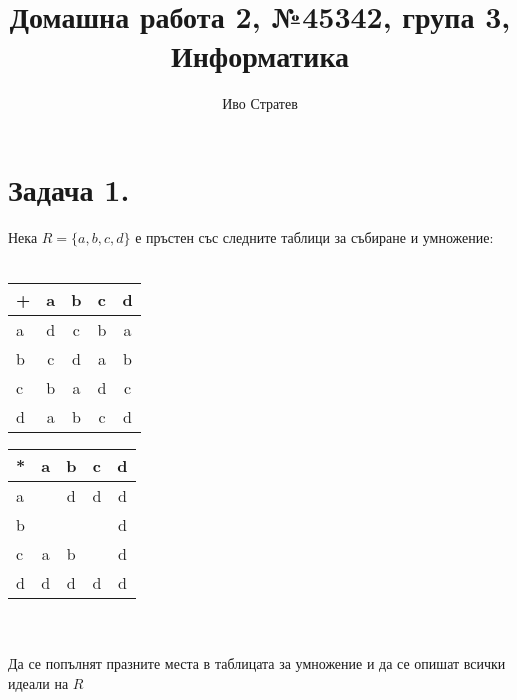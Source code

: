 \documentclass[12pt]{article}
\title{Домашна работа 2, №45342, група 3, Информатика}
\author{Иво Стратев}
\begin{document}
    \maketitle
    \section*{Задача 1.}
    Нека \(R = \{a, b,c, d\}\) е пръстен със следните таблици за събиране и умножение: \\\\
    \begin{tabular}{ l | c c c c  }
	  + & a & b & c & d \\ \hline
	  a & d & c & b & a \\
	  b & c & d & a & b \\
	  c & b & a & d & c \\
	  d & a & b & c & d
	\end{tabular} \quad \quad \quad
	\begin{tabular}{ l | c c c c  }
	  * & a & b & c & d \\ \hline
	  a & ~ & d & d & d \\
	  b & ~ & ~ & ~ & d \\
	  c & a & b & ~ & d \\
	  d & d & d & d & d
	\end{tabular} \\\\
	Да се попълнят празните места в таблицата за умножение и да се опишат всички идеали на \(R\)
\end{document}
